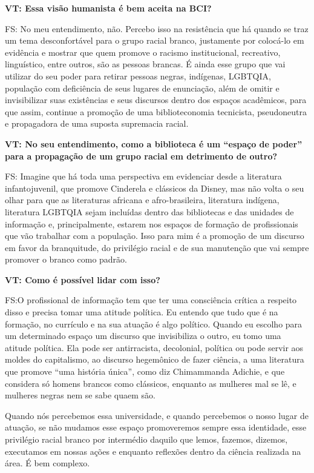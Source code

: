 \documentclass[a4paper,
fontsize=11pt,
oneside,
numbers=noperiodatend,
parskip=half-,
bibliography=totoc,
final
]{scrartcl}
\begin{document}
\textbf{VT: Essa visão humanista é bem aceita na BCI?}

FS: No meu entendimento, não. Percebo isso na resistência que há quando
se traz um tema desconfortável para o grupo racial branco, justamente
por colocá-lo em evidência e mostrar que quem promove o racismo
institucional, recreativo, linguístico, entre outros, são as pessoas
brancas. É ainda esse grupo que vai utilizar do seu poder para retirar
pessoas negras, indígenas, LGBTQIA, população com deficiência de seus
lugares de enunciação, além de omitir e invisibilizar suas existências e
seus discursos dentro dos espaços acadêmicos, para que assim, continue a
promoção de uma biblioteconomia tecnicista, pseudoneutra e propagadora
de uma suposta supremacia racial.

\textbf{VT: No seu entendimento, como a biblioteca é um \enquote{espaço
de poder} para a propagação de um grupo racial em detrimento de outro?}

FS: Imagine que há toda uma perspectiva em evidenciar desde a literatura
infantojuvenil, que promove Cinderela e clássicos da Disney, mas não
volta o seu olhar para que as literaturas africana e afro-brasileira,
literatura indígena, literatura LGBTQIA sejam incluídas dentro das
bibliotecas e das unidades de informação e, principalmente, estarem nos
espaços de formação de profissionais que vão trabalhar com a população.
Isso para mim é a promoção de um discurso em favor da branquitude, do
privilégio racial e de sua manutenção que vai sempre promover o branco
como padrão.

\textbf{VT: Como é possível lidar com isso?}

FS:O profissional de informação tem que ter uma consciência crítica a
respeito disso e precisa tomar uma atitude política. Eu entendo que tudo
que é na formação, no currículo e na sua atuação é algo político. Quando
eu escolho para um determinado espaço um discurso que invisibiliza o
outro, eu tomo uma atitude política. Ela pode ser antirracista,
decolonial, política ou pode servir aos moldes do capitalismo, ao
discurso hegemônico de fazer ciência, a uma literatura que promove
\enquote{uma história única}, como diz Chimammanda Adichie, e que
considera só homens brancos como clássicos, enquanto as mulheres mal se
lê, e mulheres negras nem se sabe quaem são.

Quando nós percebemos essa universidade, e quando percebemos o nosso
lugar de atuação, se não mudamos esse espaço promoveremos sempre essa
identidade, esse privilégio racial branco por intermédio daquilo que
lemos, fazemos, dizemos, executamos em nossas ações e enquanto reflexões
dentro da ciência realizada na área. É bem complexo.
\end{document}
